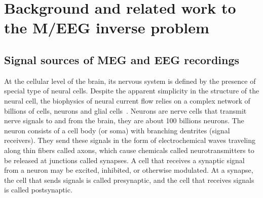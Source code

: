 
\chapter{Background and related work to the M/EEG inverse problem} %
\label{chapter:background} %
\noindent\makebox[\linewidth]{\rule{0.75\paperwidth}{0.4pt}}
\noindent\makebox[\linewidth]{\rule{0.75\paperwidth}{0.4pt}}

\localtableofcontents %

\noindent\makebox[\linewidth]{\rule{0.75\paperwidth}{0.4pt}}
\noindent\makebox[\linewidth]{\rule{0.75\paperwidth}{0.4pt}}

\newpage

\newcommand{\keyword}[1]{\textbf{#1}}
\newcommand{\tabhead}[1]{\textbf{#1}}
\newcommand{\code}[1]{\texttt{#1}}
\newcommand{\file}[1]{\texttt{\bfseries#1}}
\newcommand{\option}[1]{\texttt{\itshape#1}}


\section{Signal sources of MEG and EEG recordings}
At the cellular level of the brain, its nervous system is defined by the presence of special type of neural cells. Despite the apparent simplicity in the structure of the neural cell, the biophysics of neural current flow relies on a complex network of billions of cells, neurons and glial cells~\cite{baillet2001electromagnetic, hodgkin1964conduction}. Neurons are nerve cells that transmit nerve signals to and from the brain, they are about 100 billions neurons. The neuron consists of a cell body (or soma) with branching dentrites (signal receivers). They send these signals in the form of electrochemical waves traveling along thin fibers called axons, which cause chemicals called neurotransmitters to be released at junctions called synapses. A cell that receives a synaptic signal from a neuron may be excited, inhibited, or otherwise modulated. At a synapse, the cell that sends signals is called presynaptic, and the cell that receives signals is called postsynaptic.\\

